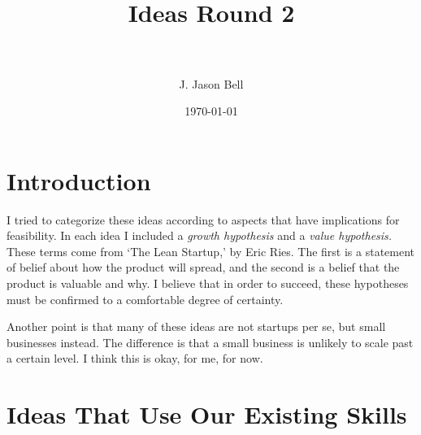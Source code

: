 \documentclass[paper=a4, fontsize=11pt]{scrartcl} %
\title{	
\normalfont \normalsize 
\horrule{0.5pt} \\[0.4cm] %
\huge Ideas Round 2 \\ %
\horrule{2pt} \\[0.5cm] %
}
\author{J. Jason Bell} %
\date{\normalsize\today} %
\numberwithin{equation}{section} %
\numberwithin{figure}{section} %
\numberwithin{table}{section} %
\begin{document}
\maketitle %



\section{Introduction}

I tried to categorize these ideas according to aspects that have implications for feasibility.  In each idea I included a \textit{growth hypothesis} and a \textit{value hypothesis.}  These terms come from `The Lean Startup,' by Eric Ries.  The first is a statement of belief about how the product will spread, and the second is a belief that the product is valuable and why.  I believe that in order to succeed, these hypotheses must be confirmed to a comfortable degree of certainty.  

Another point is that many of these ideas are not startups per se, but small businesses instead.  The difference is that a small business is unlikely to scale past a certain level.  I think this is okay, for me, for now.
\section{Ideas That Use Our Existing Skills}
\end{document}
